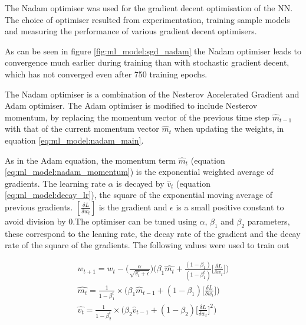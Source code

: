 The Nadam optimiser was used for the gradient decent optimisation of the NN. The choice of optimiser resulted from experimentation, training sample models and measuring the performance of various gradient decent optimisers.

As can be seen in figure \ref{fig:ml_model:sgd_nadam} the Nadam optimiser leads to convergence much earlier during training than with stochastic gradient decent, which has not converged even after 750 training epochs.


The Nadam optimiser is a combination of the Nesterov Accelerated Gradient and Adam optimiser. The Adam optimiser is modified to include Nesterov momentum, by replacing the momentum vector of the previous time step $\hat{m}_{t-1}$ with that of the current momentum vector $\hat{m}_t$ when updating the weights, in equation \ref{eq:ml_model:nadam_main}.

As in the Adam equation, the momentum term $\hat{m}_t$ (equation \ref{eq:ml_model:nadam_momentum}) is the exponential weighted average of gradients. The learning rate $\alpha$ is decayed by $\hat{v}_t$ (equation \ref{eq:ml_model:decay_lr}), the square of the exponential moving average of previous gradients. $ [\frac{\delta L}{\delta w_t}]$ is the gradient and $\epsilon$ is a small positive constant to avoid division by 0.The optimiser can be tuned using $\alpha$, $\beta_1$ and $\beta_2$ parameters, these correspond to the leaning rate, the decay rate of the gradient and the decay rate of the square of the gradients. The following values were used to train out 







\begin{gather}
    w_{t+1} = w_t - \big( \frac{\alpha}{\sqrt{\hat{v_t} + \epsilon}} \big) \Bigg( \beta_{1} \hat{m_{t}} + \frac{(1 - \beta_1)}{(1 - \beta^{t}_1)} \bigg[\frac{\delta L}{\delta w_t}\bigg] \Bigg) \label{eq:ml_model:nadam_main} \\ 
    \hat{m_t} = \frac{1}{1 - \beta^{t}_1} \times \Bigg( \beta_{1} \hat{m}_{t-1} + (1 - \beta_1) \bigg[\frac{\delta L}{\delta w_t}\bigg] \Bigg) \label{eq:ml_model:nadam_momentum} \\
    \hat{v_t} = \frac{1}{1 - \beta^{t}_2} \times \Bigg( \beta_2 \hat{v}_{t-1} + ( 1- \beta_2) \bigg[\frac{\delta L}{\delta w_t}\bigg]^2 \Bigg) \label{eq:ml_model:decay_lr}
\end{gather}





